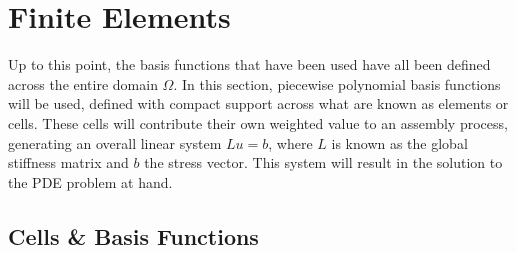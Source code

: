 \section{Finite Elements}

Up to this point, the basis functions that have been used have all been defined across the entire domain $\Omega$. In this section, piecewise polynomial basis functions will be used, defined with compact support across what are known as elements or cells. These cells will contribute their own weighted value to an assembly process, generating an overall linear system $Lu = b$, where $L$ is known as the global stiffness matrix and $b$ the stress vector. This system will result in the solution to the PDE problem at hand.

\subsection{Cells \& Basis Functions}

